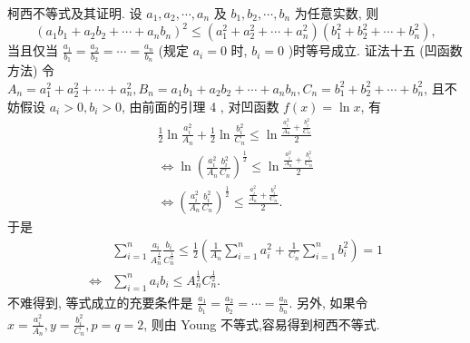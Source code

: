 柯西不等式及其证明.
设 $a_1, a_2, \cdots, a_n$ 及 $b_1, b_2, \cdots, b_n$ 为任意实数, 则
$$
\left(a_1 b_1+a_2 b_2+\cdots+a_n b_n\right)^2 \leqslant\left(a_1^2+a_2^2+\cdots+a_n^2\right)\left(b_1^2+b_2^2+\cdots+b_n^2\right),
$$
当且仅当 $\frac{a_1}{b_1}=\frac{a_2}{b_2}=\cdots=\frac{a_n}{b_n}$ (规定 $a_i=0$ 时, $b_i=0$ )时等号成立.
证法十五 (凹函数方法)
令 $A_n=a_1^2+a_2^2+\cdots+a_n^2, B_n=a_1 b_1+a_2 b_2+\cdots+a_n b_n, C_n=b_1^2+ b_2^2+\cdots+b_n^2$, 且不妨假设 $a_i>0, b_i>0$, 由前面的引理 4 , 对凹函数 $f(x)= \ln x$, 有
$$
\begin{gathered}
\frac{1}{2} \ln \frac{a_i^2}{A_n}+\frac{1}{2} \ln \frac{b_i^2}{C_n} \leqslant \ln \frac{\frac{a_i^2}{A_n}+\frac{b_i^2}{C_n}}{2} \\
\Leftrightarrow \ln \left(\frac{a_i^2}{A_n} \frac{b_i^2}{C_n}\right)^{\frac{1}{2}} \leqslant \ln \frac{\frac{a_i^2}{A_n}+\frac{b_i^2}{C_n}}{2} \\
\Leftrightarrow\left(\frac{a_i^2}{A_n} \frac{b_i^2}{C_n}\right)^{\frac{1}{2}} \leqslant \frac{\frac{a_i^2}{A_n}+\frac{b_i^2}{C_n}}{2} .
\end{gathered}
$$
于是
$$
\begin{aligned}
& \sum_{i=1}^n \frac{a_i}{A_n^{\frac{1}{2}}} \frac{b_i}{C_n^{\frac{1}{2}}} \leqslant \frac{1}{2}\left(\frac{1}{A_n} \sum_{i=1}^n a_i^2+\frac{1}{C_n} \sum_{i=1}^n b_i^2\right)=1 \\
\Leftrightarrow & \sum_{i=1}^n a_i b_i \leqslant A_n^{\frac{1}{2}} C_n^{\frac{1}{2}} .
\end{aligned}
$$
不难得到, 等式成立的充要条件是 $\frac{a_1}{b_1}=\frac{a_2}{b_2}=\cdots=\frac{a_n}{b_n}$.
另外, 如果令 $x=\frac{a_i^2}{A_n}, y=\frac{b_i^2}{C_n}, p=q=2$, 则由 Young 不等式,容易得到柯西不等式.



